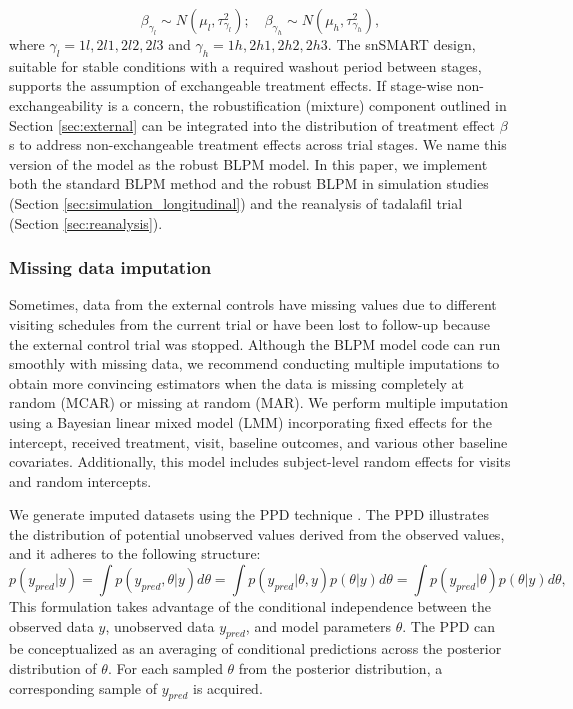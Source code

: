 \begin{equation}
\beta_{\gamma_l} \sim N(\mu_l, \tau_{\gamma_l}^2); \quad \beta_{\gamma_h} \sim N(\mu_h, \tau_{\gamma_h}^2),
\end{equation}
where $\gamma_l = 1l, 2l1, 2l2, 2l3$ and $\gamma_h = 1h, 2h1, 2h2, 2h3$. The \ac{snSMART} design, suitable for stable conditions with a required washout period between stages, supports the assumption of exchangeable treatment effects. If stage-wise non-exchangeability is a concern, the robustification (mixture) component outlined in Section  \ref{sec:external} can be integrated into the distribution of treatment effect $\beta$s to address non-exchangeable treatment effects across trial stages. We name this version of the model as the robust \ac{BLPM} model. In this paper, we implement both the standard \ac{BLPM} method and the robust \ac{BLPM} in simulation studies (Section \ref{sec:simulation_longitudinal}) and the reanalysis of tadalafil trial (Section \ref{sec:reanalysis}).

\subsubsection{Missing data imputation}
\label{sec:missing}
Sometimes, data from the external controls have missing values due to different visiting schedules from the current trial or have been lost to follow-up because the external control trial was stopped. Although the \ac{BLPM} model code can run smoothly with missing data, we recommend conducting multiple imputations to obtain more convincing estimators when the data is missing completely at random (MCAR) or missing at random (MAR). We perform multiple imputation using a Bayesian linear mixed model (LMM) incorporating fixed effects for the intercept, received treatment, visit, baseline outcomes, and various other baseline covariates. Additionally, this model includes subject-level random effects for visits and random intercepts. 

We generate imputed datasets using the \ac{PPD} technique \citep{gelman2014bayesian}. The \ac{PPD} illustrates the distribution of potential unobserved values derived from the observed values, and it adheres to the following structure:
$$p(y_{pred}|y) = \int{p(y_{pred},\theta|y)d\theta} = \int{p(y_{pred}|\theta,y)p(\theta|y)d\theta} = \int{p(y_{pred}|\theta)p(\theta|y)d\theta},$$
This formulation takes advantage of the conditional independence between the observed data $y$, unobserved data $y_{pred}$, and model parameters $\theta$. The \ac{PPD} can be conceptualized as an averaging of conditional predictions across the posterior distribution of $\theta$. For each sampled $\theta$ from the posterior distribution, a corresponding sample of $y_{pred}$ is acquired.

